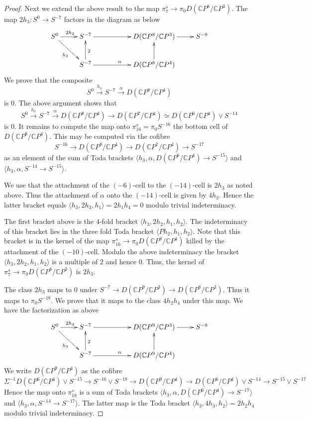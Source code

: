 \documentclass[a4paper,leqno,12pt]{amsart}
\theoremstyle{plain}
\theoremstyle{definition}
\numberwithin{equation}{section}
\begin{document}
\begin{proof}
Next we extend the above result to the map $\pi_7^s \to \pi_0 D({\mathbb{C}} P^8/ {\mathbb{C}} P^3)$. The map $2h_3 : S^0 \to S^{-7}$ factors in the diagram as below
$$\xymatrix{S^0 \ar[r]^{2h_3} \ar[rd]_{h_3}   & S^{-7} \ar[rr] & & D({\mathbb{C}} P^8/{\mathbb{C}} P^3) \ar[r] & S^{-8} \\ 
                         &   S^{-7} \ar[u]_{2} \ar[rr]^{\alpha}        & & D({\mathbb{C}} P^8/{\mathbb{C}} P^4) \ar[u] }$$
We prove that the composite 
$$ S^0 \stackrel{h_3}{\to} S^{-7} \stackrel{\alpha}{\to} D({\mathbb{C}} P^8/{\mathbb{C}} P^4)$$ 
is $0$. The above argument shows that 
$$ S^0 \stackrel{h_3}{\to} S^{-7} \stackrel{\alpha}{\to} D({\mathbb{C}} P^8/{\mathbb{C}} P^4)\to D({\mathbb{C}} P^7/ {\mathbb{C}} P^4)\simeq D({\mathbb{C}} P^6/{\mathbb{C}} P^4) \vee S^{-14}$$ 
is 0. It remains to compute the map onto $\pi_{16}^s = \pi_0 S^{-16}$ the bottom cell of $D({\mathbb{C}} P^8/{\mathbb{C}} P^4)$. This may be computed via the cofibre 
$$ S^{-16} \to D({\mathbb{C}} P^8/{\mathbb{C}} P^4)\to D({\mathbb{C}} P^7/ {\mathbb{C}} P^4) \to S^{-17}$$
as an element of the sum of Toda brackets $\langle h_3, \alpha, D({\mathbb{C}} P^6/{\mathbb{C}} P^4) \to S^{-15} \rangle$ and $\langle h_3, \alpha, S^{-14} \to S^{-15}\rangle$. 

We use that the attachment of the $(-6)$-cell to the $(-14)$-cell is $2h_3$ as noted above. Thus the attachment of $\alpha$ onto the $(-14)$-cell is given by  $4h_3$. Hence the latter bracket equals $\langle h_3, 2h_3, h_1\rangle = 2h_1h_4=0$ modulo trivial indeterminacy. 

The first bracket above is the $4$-fold bracket $\langle h_3, 2h_2, h_1,h_2\rangle$. The indeterminacy of this bracket lies in the three fold Toda bracket $\langle Ph_2, h_1,h_2\rangle$. Note that this bracket is in the kernel of the map $\pi_{16}^s \to \pi_0 D({\mathbb{C}} P^8/{\mathbb{C}} P^4)$ killed by the attachment of the $(-10)$-cell. Modulo the above indeterminacy the bracket $\langle h_3, 2h_2, h_1,h_2\rangle$ is a multiple of $2$ and hence $0$. Thus, the kernel of $\pi_7^s \to \pi_0 D({\mathbb{C}} P^8/ {\mathbb{C}} P^3)$ is $2h_3$. 

The class $2h_3$ maps to $0$ under $S^{-7} \to D({\mathbb{C}} P^9/{\mathbb{C}} P^3) \to D({\mathbb{C}} P^8/{\mathbb{C}} P^3)$. Thus it maps to $\pi_0S^{-18}$. We prove that it maps to the class $4h_2h_4$ under this map. We have the factorization as above
$$\xymatrix{S^0 \ar[r]^{2h_3} \ar[rd]_{h_3}   & S^{-7} \ar[rr] & & D({\mathbb{C}} P^9/{\mathbb{C}} P^3) \ar[r] & S^{-8} \\ 
                         &   S^{-7} \ar[u]_{2} \ar[rr]^{\alpha}        & & D({\mathbb{C}} P^9/{\mathbb{C}} P^4) \ar[u] }$$ 
We write $D({\mathbb{C}} P^9/{\mathbb{C}} P^4)$ as the cofibre 
$$\Sigma^{-1} D({\mathbb{C}} P^6/ {\mathbb{C}} P^4) \vee S^{-15} \to S^{-16}\vee S^{-18} \to D({\mathbb{C}} P^9/{\mathbb{C}} P^4) \to D({\mathbb{C}} P^6/ {\mathbb{C}} P^4) \vee S^{-14}\to  S^{-15}\vee S^{-17}$$
Hence the map onto $\pi_{18}^s$ is a sum of Toda brackets $\langle h_3, \alpha, D({\mathbb{C}} P^6/ {\mathbb{C}} P^4) \to S^{-17}\rangle$ and $\langle h_3, \alpha, S^{-14} \to S^{-17}\rangle$. The latter map is the Toda bracket $\langle h_3, 4h_3,h_2\rangle = 2h_2h_4$  modulo trivial indeterminacy. 


\end{proof}
\end{document}
